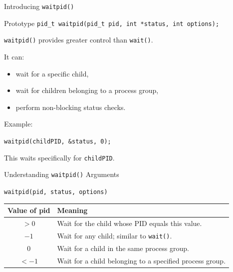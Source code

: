 \documentclass[aspectratio=169]{beamer}
\begin{document}
\begin{frame}{Introducing \texttt{waitpid()}}

\begin{block}{Prototype}
\centering
\texttt{pid\_t waitpid(pid\_t pid, int *status, int options);}
\end{block}

\texttt{waitpid()} provides greater control than \texttt{wait()}.

It can:

\begin{itemize}

    \item wait for a specific child,

    \item wait for children belonging to a process group,

    \item perform non-blocking status checks.

\end{itemize}

Example:

\begin{center}
\texttt{waitpid(childPID, \&status, 0);}
\end{center}

This waits specifically for \texttt{childPID}.

\end{frame}

\begin{frame}{Understanding \texttt{waitpid()} Arguments}

\begin{center}
\texttt{waitpid(pid, status, options)}
\end{center}

\begin{center}
\begin{tabular}{|c|p{8cm}|}
\hline
\textbf{Value of pid} & \textbf{Meaning} \\
\hline

$>0$
&
Wait for the child whose PID equals this value.
\\
\hline

$-1$
&
Wait for any child; similar to \texttt{wait()}.
\\
\hline

$0$
&
Wait for a child in the same process group.
\\
\hline

$<-1$
&
Wait for a child belonging to a specified process group.
\\
\hline

\end{tabular}
\end{center}

\end{frame}
\end{document}
